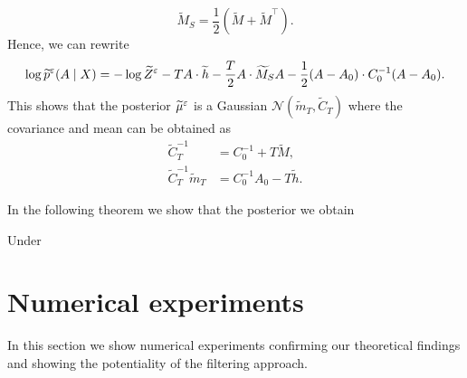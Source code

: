 \documentclass[10pt]{article}
\begin{document}
\begin{equation}
	\widetilde M_S = \frac12 \left(\widetilde M + \widetilde M^\top\right).
\end{equation}
Hence, we can rewrite 
\begin{equation}	
	\log \widetilde p^\varepsilon(A \mid X) = -\log \widetilde Z^\varepsilon - T A \cdot \widetilde h - \frac{T}{2} A \cdot \widetilde M_S A - \frac12 (A - A_0) \cdot C_0^{-1}(A-A_0).
\end{equation}
This shows that the posterior $\widetilde \mu^\varepsilon$ is a Gaussian $\mathcal N(\widetilde m_T, \widetilde C_T)$ where the covariance and mean can be obtained as 
\begin{equation}
\begin{aligned}
	\widetilde C_T^{-1} &= C_0^{-1} + T \widetilde M, \\
	\widetilde C_T^{-1} \widetilde m_T &= C_0^{-1}A_0 - T \widetilde h. 
\end{aligned}
\end{equation}

In the following theorem we show that the posterior we obtain 
\begin{theorem} Under
\end{theorem}

\section{Numerical experiments}

In this section we show numerical experiments confirming our theoretical findings and showing the potentiality of the filtering approach.
\end{document}
